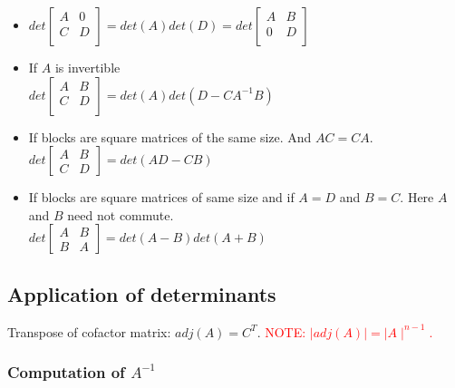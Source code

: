 \begin{itemize}
\item 
$det
\begin{bmatrix}
A & 0 \\
C & D\\ 
\end{bmatrix}
= det(A) det(D) = 
det
\begin{bmatrix}
A & B\\
0 & D\\
\end{bmatrix}
$
\item If $A$ is invertible\\
$
det
\begin{bmatrix}
A & B\\
C & D\\
\end{bmatrix}
 = det(A)det(D - CA^{-1}B)
$
\item If blocks are square matrices of the same size. And $AC = CA$.\\
$det
\begin{bmatrix}
A & B\\
C & D
\end{bmatrix}
 = det(AD - CB)
$

\item If blocks are square matrices of same size and if $A = D$ and $B = C$. Here $A$ and $B$ need not commute.\\
$
det
\begin{bmatrix}
A & B\\
B & A
\end{bmatrix}
 = det(A - B)det(A + B)
$
\end{itemize}

 
\subsection{Application of determinants}


\begin{definition}
Transpose of cofactor matrix: $adj(A) = C^T$.
\textcolor{red}{NOTE: $\mid adj(A) \mid = \mid A \mid ^ {n-1}$.}
\end{definition}

\subsubsection{Computation of $A^{-1}$}


